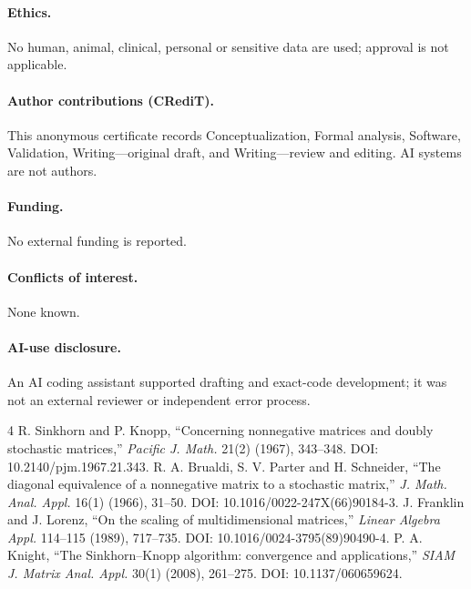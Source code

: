 \documentclass[9pt]{extarticle}
\begin{document}
\paragraph{Ethics.} No human, animal, clinical, personal or sensitive data are
used; approval is not applicable.
\paragraph{Author contributions (CRediT).} This anonymous certificate records
Conceptualization, Formal analysis, Software, Validation, Writing---original
draft, and Writing---review and editing. AI systems are not authors.
\paragraph{Funding.} No external funding is reported.
\paragraph{Conflicts of interest.} None known.
\paragraph{AI-use disclosure.} An AI coding assistant supported drafting and
exact-code development; it was not an external reviewer or independent error
process.

\begin{thebibliography}{4}
 R. Sinkhorn and P. Knopp, ``Concerning nonnegative matrices and
doubly stochastic matrices,'' \emph{Pacific J. Math.} 21(2) (1967), 343--348.
DOI: 10.2140/pjm.1967.21.343.
 R. A. Brualdi, S. V. Parter and H. Schneider, ``The diagonal
equivalence of a nonnegative matrix to a stochastic matrix,'' \emph{J. Math.
Anal. Appl.} 16(1) (1966), 31--50. DOI: 10.1016/0022-247X(66)90184-3.
 J. Franklin and J. Lorenz, ``On the scaling of multidimensional
matrices,'' \emph{Linear Algebra Appl.} 114--115 (1989), 717--735.
DOI: 10.1016/0024-3795(89)90490-4.
 P. A. Knight, ``The Sinkhorn--Knopp algorithm: convergence and
applications,'' \emph{SIAM J. Matrix Anal. Appl.} 30(1) (2008), 261--275.
DOI: 10.1137/060659624.
\end{thebibliography}
\end{document}
